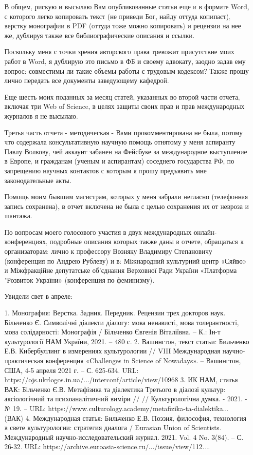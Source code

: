 В общем, рискую и высылаю Вам опубликованные статьи еще и в формате Word, с
которого легко копировать текст (не приведи Бог, найду оттуда копипаст),
верстку монографии в PDF (оттуда тоже можно копировать) и рецензии на нее же,
дублируя также все библиографические описания и ссылки. 

Поскольку меня с точки зрения авторского права тревожит присутствие моих работ
в Word, я дублирую это письмо в ФБ и своему адвокату, заодно задав ему вопрос:
совместимы ли такие объемы работы с трудовым кодексом? Также прошу лично
передать все документы заведующему кафедрой. 

Еще шесть моих поданных за месяц статей, указанных во второй части отчета,
включая три Web of Science, в целях защиты своих прав и прав международных
журналов я не высылаю. 

Третья часть отчета - методическая - Вами прокомментирована не была, потому что
содержала консультативную научную помощь отнятому у меня аспиранту Павлу
Волкову, чей аккаунт забанен на Фейсбуке за международное выступление в Европе,
и гражданам (ученым и аспирантам) соседнего государства РФ, по запрещению
научных контактов с которым я прошу предъявить мне законодательные акты. 

Помощь моим бывшим магистрам, которых у меня забрали негласно (телефонная
запись сохранена), в отчет включена не была с целью сохранения их от невроза и
шантажа. 

По вопросам моего голосового участия в двух международных онлайн-конференциях,
подробные описания которых также даны в отчете, обращаться к организаторам:
лично к профессору Возняку Владимиру Степановичу (конференция по Андрею
Рублеву) и в: Міжнародний культурний центр «Сяйво» и Міжфракційне депутатське
об’єднання Верховної Ради України «Платформа "Розвиток України» (конференция по
феминизму).

Увидели свет в апреле:

1. Монография: Верстка. Задник. Передник. Рецензии трех докторов наук. Більченко Є. Символічні діалекти діалогу: мова ненависті, мова толерантності, мова солідарності: Монографія / Більченко Євгенія Віталіївна. – К.: Ін-т культурології НАМ України, 2021. –  480 с.
2. Вашингтон, текст статьи: Бильченко Е.В. Кибербуллинг в измерениях культурологии // VIII Международная научно-практическая конференция «Challenges in Science of Nowadays». – Вашингтон, США, 4-5 апреля 2021 г. – С. 625-634. URL: https://ojs.ukrlogos.in.ua/.../interconf/article/view/10968
3. ИК НАМ, статья ВАК: Більченко Є.В. Метафізика та діалектика Третього в діалозі культур: аксіологічний та психоаналітичний виміри // // Культурологічна думка. - 2021. - № 19. – URL: https://www.culturology.academy/metafizika-ta-dialektika... (ВАК)
4. Международная статья: Бильченко Е.В. Поэзия, философия, технология в свете культурологии: стратегия диалога / Eurasian Union of Scientists. Международный научно-исследовательский журнал.  2021. Vol. 4 No. 3(84). – С. 26-32. URL:
https://archive.euroasia-science.ru/.../issue/view/112....
